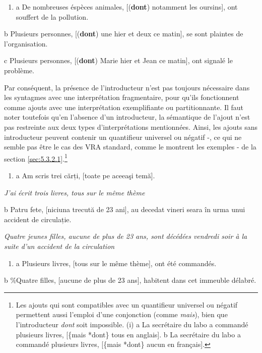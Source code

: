 \begin{enumerate}
\item \label{bkm:Ref296067476}a  De nombreuses éspèces animales, [(\textbf{dont}) notamment les oursins], ont souffert de la pollution. 


\end{enumerate}
  b  Plusieurs personnes, [(\textbf{dont}) une hier et deux ce matin], se sont plaintes de l'organisation.

  c  Plusieurs personnes, [(\textbf{dont})\textbf{} Marie hier et Jean ce matin], ont signalé le problème.

Par conséquent, la présence de l'introducteur n'est pas toujours nécessaire dans les syntagmes avec une interprétation fragmentaire, pour qu'ils fonctionnent comme ajouts avec une interprétation exemplifiante ou partitionnante. Il faut noter toutefois qu'en l'absence d'un introducteur, la sémantique de l'ajout n'est pas restreinte aux deux types d'interprétations mentionnées. Ainsi, les ajouts sans introducteur peuvent contenir un quantifieur universel ou négatif -, ce qui ne semble pas être le cas des VRA standard, comme le montrent les exemples - de la section \ref{sec:5.3.2.1}.\footnote{Les ajouts qui sont compatibles avec un quantifieur universel ou négatif permettent aussi l'emploi d'une conjonction (comme \textit{mais}), bien que l'introducteur \textit{dont} soit impossible.
(i)  a  La secrétaire du labo a commandé plusieurs livres, [\{mais {\textbar} *dont\} tous en anglais]. 
  b  La secrétaire du labo a commandé plusieurs livres, [\{mais {\textbar} *dont\} aucun en français].
 } 


\begin{enumerate}
\item \label{bkm:Ref298798949}a  Am scris trei cărți, [toate pe aceeaşi temă].  


\end{enumerate}
  \textit{J'ai écrit trois livres, tous sur le même thème} 

  b  Patru fete, [niciuna trecută de 23 ani], au decedat vineri seara în urma unui accident de circulație.

{\itshape
Quatre jeunes filles, aucune de plus de 23 ans, sont décédées vendredi soir à la suite d'un accident de la circulation}


\begin{enumerate}
\item \label{bkm:Ref298798951}a  Plusieurs livres, [tous sur le même thème], ont été commandés. 


\end{enumerate}
  b  \%Quatre filles, [aucune de plus de 23 ans], habitent dans cet immeuble délabré.

